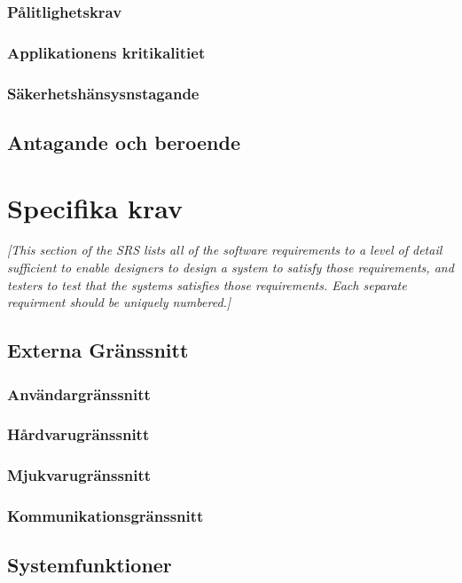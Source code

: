 \documentclass{article}
\begin{document}
\begin{enumerate}
\subsubsection{Pålitlighetskrav}
\subsubsection{Applikationens kritikalitiet}
\subsubsection{Säkerhetshänsysnstagande}

\subsection{Antagande och beroende}


\section{Specifika krav}
\label{sec:specific}
\emph{[This section of the \ac{SRS} lists all of the software requirements to
  a level of detail sufficient to enable designers to design a system to
  satisfy those requirements, and testers to test that the systems satisfies
  those requirements. Each separate requirment should be uniquely numbered.]}

\subsection{Externa Gränssnitt}

\subsubsection{Användargränssnitt}
\subsubsection{Hårdvarugränssnitt}
\subsubsection{Mjukvarugränssnitt}
\subsubsection{Kommunikationsgränssnitt}
\subsection{Systemfunktioner}

\end{enumerate}
\end{document}
